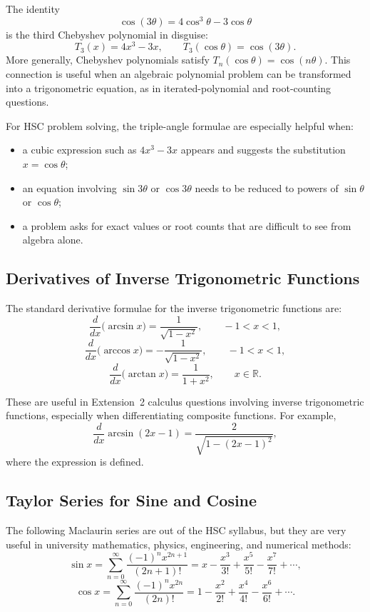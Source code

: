 \documentclass[12pt]{article}
\newenvironment{remark}[1][]{%
  \begin{remarkbox}[title={\bfseries Remark~\thetcbcounter\ifx\relax#1\relax\else\ (#1)\fi}]%
}{%
  \end{remarkbox}%
}
\begin{document}
\begin{remark}[Connection with Chebyshev polynomials]
The identity
\[
\cos(3\theta)=4\cos^3\theta-3\cos\theta
\]
is the third Chebyshev polynomial in disguise:
\[
T_3(x)=4x^3-3x,
\qquad
T_3(\cos\theta)=\cos(3\theta).
\]
More generally, Chebyshev polynomials satisfy
$T_n(\cos\theta)=\cos(n\theta)$. This connection is useful when an algebraic
polynomial problem can be transformed into a trigonometric equation, as in
iterated-polynomial and root-counting questions.
\end{remark}

For HSC problem solving, the triple-angle formulae are especially helpful when:
\begin{itemize}[leftmargin=*]
  \item a cubic expression such as $4x^3-3x$ appears and suggests the
        substitution $x=\cos\theta$;
  \item an equation involving $\sin3\theta$ or $\cos3\theta$ needs to be reduced
        to powers of $\sin\theta$ or $\cos\theta$;
  \item a problem asks for exact values or root counts that are difficult to see
        from algebra alone.
\end{itemize}

\subsection{Derivatives of Inverse Trigonometric Functions}

The standard derivative formulae for the inverse trigonometric functions are:
\[
\frac{d}{dx}\bigl(\arcsin x\bigr)=\frac{1}{\sqrt{1-x^2}},
\qquad -1<x<1,
\]
\[
\frac{d}{dx}\bigl(\arccos x\bigr)=-\frac{1}{\sqrt{1-x^2}},
\qquad -1<x<1,
\]
\[
\frac{d}{dx}\bigl(\arctan x\bigr)=\frac{1}{1+x^2},
\qquad x\in\mathbb{R}.
\]

These are useful in Extension~2 calculus questions involving inverse
trigonometric functions, especially when differentiating composite functions.
For example,
\[
\frac{d}{dx}\arcsin(2x-1)
=
\frac{2}{\sqrt{1-(2x-1)^2}},
\]
where the expression is defined.

\subsection{Taylor Series for Sine and Cosine}

The following Maclaurin series are out of the HSC syllabus, but they are very
useful in university mathematics, physics, engineering, and numerical methods:
\[
\sin x
=
\sum_{n=0}^{\infty}\frac{(-1)^n x^{2n+1}}{(2n+1)!}
=
x-\frac{x^3}{3!}+\frac{x^5}{5!}-\frac{x^7}{7!}+\cdots,
\]
\[
\cos x
=
\sum_{n=0}^{\infty}\frac{(-1)^n x^{2n}}{(2n)!}
=
1-\frac{x^2}{2!}+\frac{x^4}{4!}-\frac{x^6}{6!}+\cdots.
\]
\end{document}
